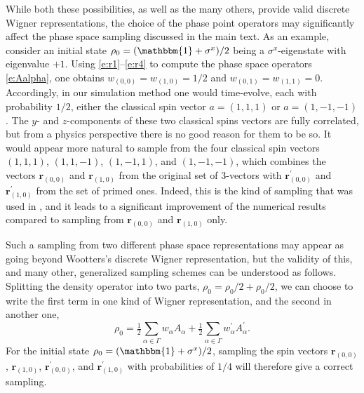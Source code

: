\documentclass[aps,prl,showpacs,amsmath,amssymb,superscriptaddress,reprint,10pt]{revtex4-1}
\newcommand\id{{\mathbbm{1}}}
\newcommand{\mvec}[1]{\boldsymbol #1}
\begin{document}
\begin{bibunit}
While both these possibilities, as well as the many others, provide valid discrete Wigner representations, the choice of the phase point operators may significantly affect the phase space sampling discussed in the main text. As an example, consider an initial state $\rho_0 = (\id+\sigma^x)/2$ being a $\sigma^x$-eigenstate with eigenvalue $+1$. Using \eqref{e:r1}--\eqref{e:r4} to compute the phase space operators \eqref{e:Aalpha}, one obtains $w_{(0,0)}=w_{(1,0)}=1/2$ and 
$w_{(0,1)}=w_{(1,1)}=0$. Accordingly, in our simulation method one would time-evolve, each with probability $1/2$, either the classical spin vector $a=(1,1,1)$ or $a=(1,-1,-1)$. The $y$- and $z$-components of these two classical spins vectors are fully correlated, but from a physics perspective there is no good reason for them to be so. It would appear more natural to sample from the four classical spin vectors $(1,1,1)$, $(1,1,-1)$, $(1,-1,1)$, and $(1,-1,-1)$, which combines the vectors $\mvec{r}_{(0,0)}$ and $\mvec{r}_{(1,0)}$ from the original set of 3-vectors with $\mvec{r}_{(0,0)}^\prime$ and $\mvec{r}_{(1,0)}^\prime$ from the set of primed ones. Indeed, this is the kind of sampling that was used in \cite{Schachenmayer_etal15}, and it leads to a significant improvement of the numerical results compared to sampling from $\mvec{r}_{(0,0)}$ and $\mvec{r}_{(1,0)}$ only.

Such a sampling from two different phase space representations may appear as going beyond Wootters's discrete Wigner representation, but the validity of this, and many other, generalized sampling schemes can be understood as follows. Splitting the density operator into two parts, $\rho_0=\rho_0/2+\rho_0/2$, we can choose to write the first term in one kind of Wigner representation, and the second in another one,
\begin{equation}\label{e:split1}
\rho_0=\tfrac{1}{2}\sum_{\alpha\in\Gamma}w_\alpha A_\alpha + \tfrac{1}{2}\sum_{\alpha\in\Gamma}w_\alpha^\prime A_\alpha^\prime.
\end{equation} 
For the initial state $\rho_0 = (\id+\sigma^x)/2$, sampling the spin vectors $\mvec{r}_{(0,0)}$, $\mvec{r}_{(1,0)}$, $\mvec{r}_{(0,0)}^\prime$, and $\mvec{r}_{(1,0)}^\prime$ with probabilities of $1/4$ will therefore give a correct sampling.


\end{bibunit}
\end{document}
